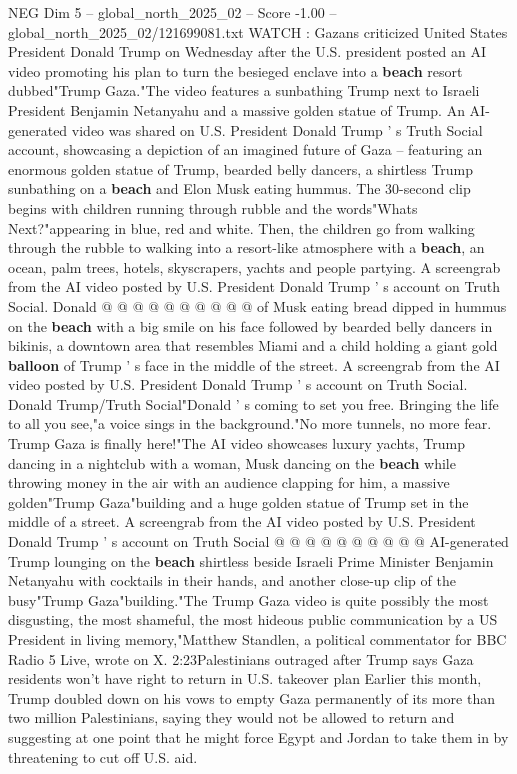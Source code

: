 \begin{textsample}{NEG Dim 5 – global\_north\_2025\_02 – Score -1.00 – global\_north\_2025\_02/121699081.txt}  \label{ex:f5_neg_127}
WATCH : Gazans criticized United States President Donald Trump on Wednesday after the U.S. president posted an AI video promoting his plan to turn the besieged enclave into a \textbf{beach} resort dubbed"Trump Gaza."The video features a sunbathing Trump next to Israeli President Benjamin Netanyahu and a massive golden statue of Trump.
An AI-generated video was shared on U.S.
President Donald Trump ' s Truth Social account, showcasing a depiction of an imagined future of Gaza -- featuring an enormous golden statue of Trump, bearded belly dancers, a shirtless Trump sunbathing on a \textbf{beach} and Elon Musk eating hummus.
The 30-second clip begins with children running through rubble and the words"Whats Next?"appearing in blue, red and white.
Then, the children go from walking through the rubble to walking into a resort-like atmosphere with a \textbf{beach}, an ocean, palm trees, hotels, skyscrapers, yachts and people partying.
A screengrab from the AI video posted by U.S.
President Donald Trump ' s account on Truth Social.
Donald @ @ @ @ @ @ @ @ @ @ of Musk eating bread dipped in hummus on the \textbf{beach} with a big smile on his face followed by bearded belly dancers in bikinis, a downtown area that resembles Miami and a child holding a giant gold \textbf{balloon} of Trump ' s face in the middle of the street.
A screengrab from the AI video posted by U.S.
President Donald Trump ' s account on Truth Social.
Donald Trump/Truth Social"Donald ' s coming to set you free.
Bringing the life to all you see,"a voice sings in the background."No more tunnels, no more fear.
Trump Gaza is finally here!"The AI video showcases luxury yachts, Trump dancing in a nightclub with a woman, Musk dancing on the \textbf{beach} while throwing money in the air with an audience clapping for him, a massive golden"Trump Gaza"building and a huge golden statue of Trump set in the middle of a street.
A screengrab from the AI video posted by U.S.
President Donald Trump ' s account on Truth Social @ @ @ @ @ @ @ @ @ @ AI-generated Trump lounging on the \textbf{beach} shirtless beside Israeli Prime Minister Benjamin Netanyahu with cocktails in their hands, and another close-up clip of the busy"Trump Gaza"building."The Trump Gaza video is quite possibly the most disgusting, the most shameful, the most hideous public communication by a US President in living memory,"Matthew Standlen, a political commentator for BBC Radio 5 Live, wrote on X. 2:23Palestinians outraged after Trump says Gaza residents won't have right to return in U.S. takeover plan Earlier this month, Trump doubled down on his vows to empty Gaza permanently of its more than two million Palestinians, saying they would not be allowed to return and suggesting at one point that he might force Egypt and Jordan to take them in by threatening to cut off U.S. aid.

\end{textsample}
